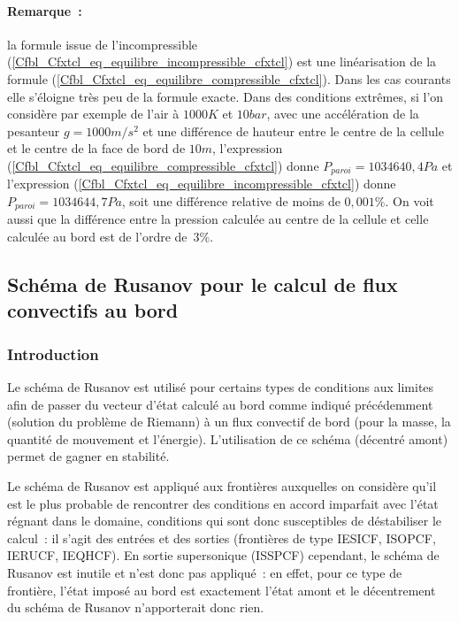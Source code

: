 \paragraph{Remarque~:}
la formule issue de l'incompressible (\ref{Cfbl_Cfxtcl_eq_equilibre_incompressible_cfxtcl})
est une linéarisation de la formule (\ref{Cfbl_Cfxtcl_eq_equilibre_compressible_cfxtcl}).
Dans les cas courants elle s'éloigne très peu de la formule exacte.
Dans des conditions extrêmes,
si l'on considère par exemple
de l'air à $1000K$ et $10bar$, avec une accélération
de la pesanteur $g=1000m/s^2$ et une différence de hauteur entre
le centre de la cellule et le centre de la face de bord de $10m$,
l'expression (\ref{Cfbl_Cfxtcl_eq_equilibre_compressible_cfxtcl}) donne $P_{paroi} = 1034640,4Pa$
et l'expression (\ref{Cfbl_Cfxtcl_eq_equilibre_incompressible_cfxtcl}) donne $P_{paroi} = 1034644,7Pa$,
soit une différence relative de moins de $0,001\%$.
On voit aussi que la différence entre la pression calculée au centre
de la cellule et celle calculée au bord est de l'ordre de~$3\%$.

\subsection*{Schéma de Rusanov pour le calcul de flux convectifs au bord}


\subsubsection*{Introduction}

Le schéma de Rusanov est utilisé pour certains types de conditions aux
limites afin de passer du vecteur d'état calculé au bord comme indiqué
précédemment (solution du problème de Riemann) à un flux convectif de
bord (pour la masse, la quantité de
mouvement et l'énergie). L'utilisation de ce schéma (décentré amont)
permet de gagner en  stabilité.

Le schéma de Rusanov est appliqué aux frontières auxquelles on considère
qu'il est le plus probable de rencontrer des conditions en accord imparfait
avec l'état régnant dans le domaine, conditions qui sont donc susceptibles de
déstabiliser le calcul~: il s'agit des entrées et des sorties (frontières
de type IESICF, ISOPCF, IERUCF, IEQHCF). En sortie
supersonique (ISSPCF) cependant, le schéma de Rusanov est inutile et
n'est donc pas appliqué~:
en effet, pour ce type de frontière, l'état imposé au bord est exactement
l'état amont et le décentrement du schéma de Rusanov n'apporterait donc
rien.


